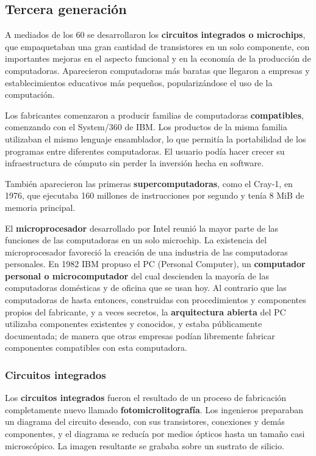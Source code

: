\documentclass[spanish,A4,]{article}
\begin{document}
\subsection{Tercera generación}\label{tercera-generaciuxf3n}

A mediados de los 60 se desarrollaron los \textbf{circuitos integrados o
microchips}, que empaquetaban una gran cantidad de transistores en un
solo componente, con importantes mejoras en el aspecto funcional y en la
economía de la producción de computadoras. Aparecieron computadoras más
baratas que llegaron a empresas y establecimientos educativos más
pequeños, popularizándose el uso de la computación.

Los fabricantes comenzaron a producir familias de computadoras
\textbf{compatibles}, comenzando con el System/360 de IBM. Los productos
de la misma familia utilizaban el mismo lenguaje ensamblador, lo que
permitía la portabilidad de los programas entre diferentes computadoras.
El usuario podía hacer crecer su infraestructura de cómputo sin perder
la inversión hecha en software.

También aparecieron las primeras \textbf{supercomputadoras}, como el
Cray-1, en 1976, que ejecutaba 160 millones de instrucciones por segundo
y tenía 8 MiB de memoria principal.

El \textbf{microprocesador} desarrollado por Intel reunió la mayor parte
de las funciones de las computadoras en un solo microchip. La existencia
del microprocesador favoreció la creación de una industria de las
computadoras personales. En 1982 IBM propuso el PC (Personal Computer),
un \textbf{computador personal o microcomputador} del cual descienden la
mayoría de las computadoras domésticas y de oficina que se usan hoy. Al
contrario que las computadoras de hasta entonces, construidas con
procedimientos y componentes propios del fabricante, y a veces secretos,
la \textbf{arquitectura abierta} del PC utilizaba componentes existentes
y conocidos, y estaba públicamente documentada; de manera que otras
empresas podían libremente fabricar componentes compatibles con esta
computadora.

\subsubsection{Circuitos integrados}\label{circuitos-integrados}

Los \textbf{circuitos integrados} fueron el resultado de un proceso de
fabricación completamente nuevo llamado \textbf{fotomicrolitografía}.
Los ingenieros preparaban un diagrama del circuito deseado, con sus
transistores, conexiones y demás componentes, y el diagrama se reducía
por medios ópticos hasta un tamaño casi microscópico. La imagen
resultante se grababa sobre un sustrato de silicio.
\end{document}
